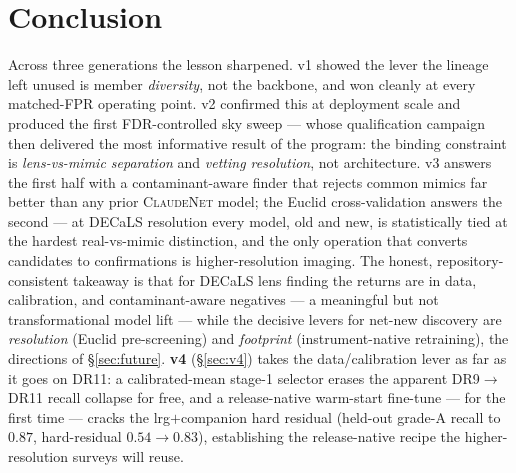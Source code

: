 \documentclass[11pt,letterpaper]{article}
\newcommand{\cnet}{\textsc{ClaudeNet}}
\begin{document}
\section{Conclusion}
Across three generations the lesson sharpened. v1 showed the lever the lineage left unused is member
\emph{diversity}, not the backbone, and won cleanly at every matched-FPR operating point. v2
confirmed this at deployment scale and produced the first FDR-controlled sky sweep --- whose
qualification campaign then delivered the most informative result of the program: the binding
constraint is \emph{lens-vs-mimic separation} and \emph{vetting resolution}, not architecture. v3
answers the first half with a contaminant-aware finder that rejects common mimics far better than any
prior \cnet{} model; the Euclid cross-validation answers the second --- at DECaLS resolution every
model, old and new, is statistically tied at the hardest real-vs-mimic distinction, and the only
operation that converts candidates to confirmations is higher-resolution imaging. The honest,
repository-consistent takeaway is that for DECaLS lens finding the returns are in data, calibration,
and contaminant-aware negatives --- a meaningful but not transformational model lift --- while the
decisive levers for net-new discovery are \emph{resolution} (Euclid pre-screening) and
\emph{footprint} (instrument-native retraining), the directions of \S\ref{sec:future}.
\textbf{v4} (\S\ref{sec:v4}) takes the data/calibration lever as far as it goes on DR11: a
calibrated-mean stage-1 selector erases the apparent DR9$\to$DR11 recall collapse for free, and a
release-native warm-start fine-tune --- for the first time --- cracks the lrg$+$companion hard residual
(held-out grade-A recall to $0.87$, hard-residual $0.54\!\to\!0.83$), establishing the release-native
recipe the higher-resolution surveys will reuse.





\end{document}
